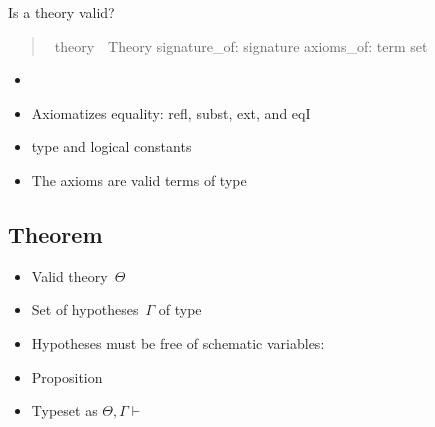 
\begin{frame}{Is a theory valid?}
    \begin{quote}
        \begin{isabelle}
            \ theory\ {\isacharequal}\ Theory\isanewline
            \isaindent{\ \ }{\isacharparenleft}signature\_of: signature{\isacharparenright}\isanewline
            \isaindent{\ \ }{\isacharparenleft}axioms\_of: term set{\isacharparenright}
        \end{isabelle}
    \end{quote}
    \begin{itemize}
        \item {}
        \item Axiomatizes equality: refl, subst, ext, and eqI
        \item {} type and logical constants
        \item The axioms are valid terms of type 
    \end{itemize}
\end{frame}

\subsection{Theorem}

\begin{frame}
    \begin{itemize}
        \item Valid theory\ \(\Theta\)
        \item Set of hypotheses\ \(\Gamma\) of type 
        \item Hypotheses must be free of schematic variables: 
        \item Proposition 
        \item Typeset as \(\Theta, \Gamma \vdash\) 

    \end{itemize}
\end{frame}

